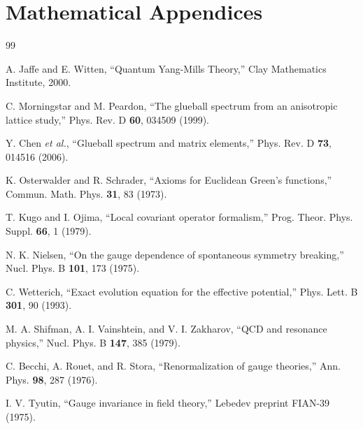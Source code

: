 \documentclass[11pt,a4paper]{article}
\theoremstyle{plain}
\theoremstyle{definition}
\begin{document}
\part{Mathematical Appendices}

\appendix









\newpage
\begin{thebibliography}{99}

A. Jaffe and E. Witten, ``Quantum Yang-Mills Theory,'' 
Clay Mathematics Institute, 2000.

C. Morningstar and M. Peardon, 
``The glueball spectrum from an anisotropic lattice study,''
Phys. Rev. D \textbf{60}, 034509 (1999).

Y. Chen \textit{et al.}, 
``Glueball spectrum and matrix elements,''
Phys. Rev. D \textbf{73}, 014516 (2006).

K. Osterwalder and R. Schrader, 
``Axioms for Euclidean Green's functions,''
Commun. Math. Phys. \textbf{31}, 83 (1973).

T. Kugo and I. Ojima, 
``Local covariant operator formalism,''
Prog. Theor. Phys. Suppl. \textbf{66}, 1 (1979).

N. K. Nielsen, 
``On the gauge dependence of spontaneous symmetry breaking,''
Nucl. Phys. B \textbf{101}, 173 (1975).

C. Wetterich, 
``Exact evolution equation for the effective potential,''
Phys. Lett. B \textbf{301}, 90 (1993).

M. A. Shifman, A. I. Vainshtein, and V. I. Zakharov,
``QCD and resonance physics,''
Nucl. Phys. B \textbf{147}, 385 (1979).

C. Becchi, A. Rouet, and R. Stora,
``Renormalization of gauge theories,''
Ann. Phys. \textbf{98}, 287 (1976).

I. V. Tyutin,
``Gauge invariance in field theory,''
Lebedev preprint FIAN-39 (1975).

\end{thebibliography}
\end{document}
